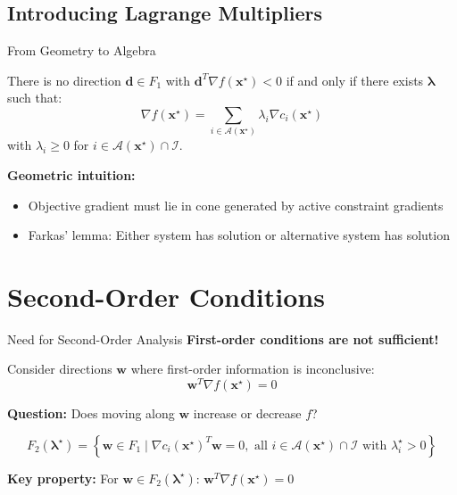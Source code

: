 \documentclass[aspectratio=1610]{beamer}
\begin{document}
\subsection{Introducing Lagrange Multipliers}
\begin{frame}{From Geometry to Algebra}
  \begin{lemma}
    There is no direction $\mathbf{d} \in F_1$ with $\mathbf{d}^T \nabla f(\mathbf{x}^{\star}) < 0$ if and only if there exists $\boldsymbol{\lambda}$ such that:
    $$\nabla f(\mathbf{x}^{\star}) = \sum_{i \in \mathcal{A}(\mathbf{x}^{\star})} \lambda_i \nabla c_i(\mathbf{x}^{\star})$$
    with $\lambda_i \geq 0$ for $i \in \mathcal{A}(\mathbf{x}^{\star}) \cap \mathcal{I}$.
  \end{lemma}
  
  \textbf{Geometric intuition:}
  \begin{itemize}
    \item Objective gradient must lie in cone generated by active constraint gradients
    \item Farkas' lemma: Either system has solution or alternative system has solution
  \end{itemize}
\end{frame}

\section{Second-Order Conditions}
\begin{frame}{Need for Second-Order Analysis}
  \textbf{First-order conditions are not sufficient!}
  
  \vspace{0.3cm}
  Consider directions $\mathbf{w}$ where first-order information is inconclusive:
  $$\mathbf{w}^T \nabla f(\mathbf{x}^{\star}) = 0$$
  
  \textbf{Question:} Does moving along $\mathbf{w}$ increase or decrease $f$?
  
  \vspace{0.5cm}
  \begin{definition}
    $$F_2(\boldsymbol{\lambda}^{\star}) = \left\{\mathbf{w} \in F_1 \mid \nabla c_i(\mathbf{x}^{\star})^T \mathbf{w} = 0, \text{ all } i \in \mathcal{A}(\mathbf{x}^{\star}) \cap \mathcal{I} \text{ with } \lambda_i^{\star} > 0\right\}$$
  \end{definition}
  
  \textbf{Key property:} For $\mathbf{w} \in F_2(\boldsymbol{\lambda}^{\star})$: $\mathbf{w}^T \nabla f(\mathbf{x}^{\star}) = 0$
\end{frame}
\end{document}
